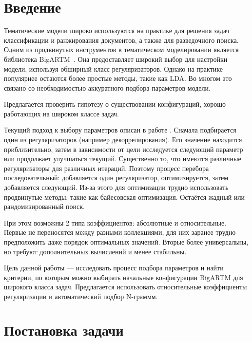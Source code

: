 \documentclass[12pt,twoside]{article}
\title
{Автоматическая настройка параметров BigARTM под широкий класс задач.}
\author
{Гришанов~А.\,В., Булатов~B.\,Г., Воронцов~К.\,В.} %
[Гришанов~А.\,В.$^1$, Булатов~B.\,Г.$^1$, Воронцов~К.\,В.$^1$] %
\begin{document}
	
	\maketitle
	
	\section{Введение}
	
	Тематические модели широко используются на практике для решения задач классификации и ранжирования документов, а также для разведочного поиска\cite{Ianina2016}. Одним из продвинутых инструментов в тематическом моделировании является библиотека BigARTM~\cite{vorontsov2015bigartm}. Она предоставляет широкий выбор для настройки модели, используя обширный класс регуляризаторов. Однако на практике популярнее остаются более простые методы, такие как LDA\cite{blei2003latent}. Во многом это связано со необходимостью аккуратного подбора параметров модели.
	
	Предлагается проверить гипотезу о существовании конфигураций, хорошо работающих на широком классе задач.
	
	Текущий подход к выбору параметров описан в работе \cite{Ianina2016}. Сначала подбирается один из регуляризаторов (например декоррелирования).  Его значение находится приблизительно, затем в зависимости от цели исследуется следующий параметр или продолжает улучшаться текущий. Существенно то, что имеются различные регуляризаторы  для различных итераций. Поэтому процесс перебора последовательный: добавляется один регуляризатор, оптимизируется, затем добавляется следующий. Из-за этого для оптимизации трудно использовать продвинутые методы, такие как байесовская оптимизация. Остаётся жадный или рандомизированный поиск.
	
	При этом возможны 2 типа коэффициентов: абсолютные и относительные. Первые не переносятся между разными коллекциями, для них заранее трудно предположить даже порядок оптимальных значений. Вторые более универсальны, но требуют дополнительных вычислений и менее стабильны.
	
	Цель данной работы --- исследовать процесс подбора параметров и найти критерии, по которым можно выбирать начальные конфигурации BigARTM для широкого класса задач. Предлагается использовать относительные коэффициенты регуляризации и автоматический подбор N-граммм.
	
	\section{Постановка задачи}
	
\end{document}
